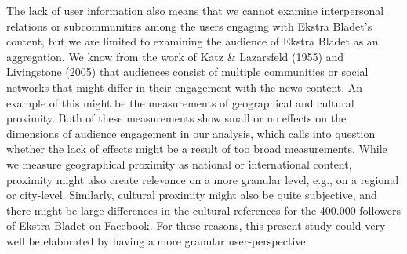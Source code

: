 \documentclass[
]{article}
\begin{document}
The lack of user information also means that we cannot examine
interpersonal relations or subcommunities among the users engaging with
Ekstra Bladet's content, but we are limited to examining the audience of
Ekstra Bladet as an aggregation. We know from the work of Katz \&
Lazarsfeld (1955) and Livingstone (2005) that audiences consist of
multiple communities or social networks that might differ in their
engagement with the news content. An example of this might be the
measurements of geographical and cultural proximity. Both of these
measurements show small or no effects on the dimensions of audience
engagement in our analysis, which calls into question whether the lack
of effects might be a result of too broad measurements. While we measure
geographical proximity as national or international content, proximity
might also create relevance on a more granular level, e.g., on a
regional or city-level. Similarly, cultural proximity might also be
quite subjective, and there might be large differences in the cultural
references for the 400.000 followers of Ekstra Bladet on Facebook. For
these reasons, this present study could very well be elaborated by
having a more granular user-perspective.

\hspace{-2.5em}
\end{document}
